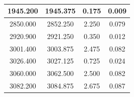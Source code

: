 \documentclass{article}
\begin{document}
\begin{appendices}
\begin{table}[h!]
\begin{tabular}{|cccc|}
	\multicolumn{1}{|c|}{1945.200} & \multicolumn{1}{c|}{1945.375} & \multicolumn{1}{c|}{0.175}  & 0.009  \\ \hline
	\multicolumn{1}{|c|}{2850.000} & \multicolumn{1}{c|}{2852.250} & \multicolumn{1}{c|}{2.250}  & 0.079  \\ \hline
	\multicolumn{1}{|c|}{2920.900} & \multicolumn{1}{c|}{2921.250} & \multicolumn{1}{c|}{0.350}  & 0.012  \\ \hline
	\multicolumn{1}{|c|}{3001.400} & \multicolumn{1}{c|}{3003.875} & \multicolumn{1}{c|}{2.475}  & 0.082  \\ \hline
	\multicolumn{1}{|c|}{3026.400} & \multicolumn{1}{c|}{3027.125} & \multicolumn{1}{c|}{0.725}  & 0.024  \\ \hline
	\multicolumn{1}{|c|}{3060.000} & \multicolumn{1}{c|}{3062.500} & \multicolumn{1}{c|}{2.500}  & 0.082  \\ \hline
	\multicolumn{1}{|c|}{3082.200} & \multicolumn{1}{c|}{3084.875} & \multicolumn{1}{c|}{2.675}  & 0.087  \\ \hline
	\end{tabular}
	\caption{}
	\label{tab:polystyrene}
\end{table}



\end{appendices}
\end{document}
